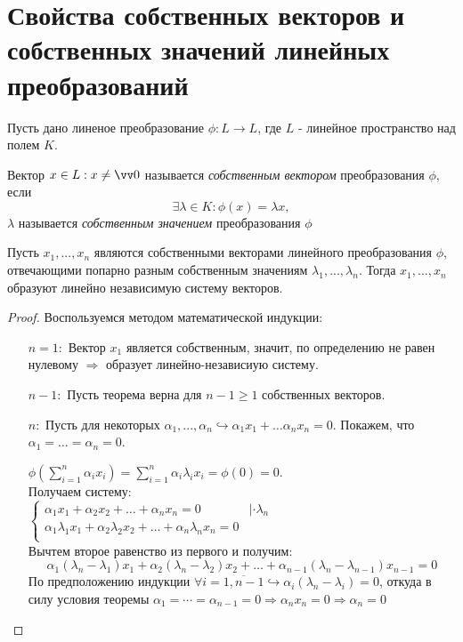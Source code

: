 \section{Свойства собственных векторов и собственных значений линейных преобразований}
Пусть дано линеное преобразование $\phi: L \rightarrow L$, где $L$ - линейное пространство над полем $K$.
\begin{defn}
Вектор $x \in L: x \neq \vv 0$ называется \textit{собственным вектором} преобразования $\phi$, если 
\begin{equation}
\exists \lambda \in K: \phi(x)=\lambda x,
\end{equation}
$\lambda$ называется \textit{собственным значением} преобразования $\phi$ 
\end{defn}
\begin{thm}
Пусть $x_1,...,x_n$ являются собственными векторами линейного преобразования $\phi$, отвечающими попарно разным собственным значениям $\lambda_1,...,\lambda_n$. Тогда $x_1,...,x_n$ образуют линейно независимую систему векторов.
\end{thm}
\begin{proof}
Воспользуемся методом математической индукции:
\linebreak\vspace*{-\baselineskip}
\begin{itemize}
\item[\underline{$n=1:$}] Вектор $x_1$ является собственным, значит, по определению не равен нулевому $\Rightarrow$ образует линейно-независиую систему.
\item[\underline{$n-1:$}] Пусть теорема верна для $n-1\ge 1$ собственных векторов.

\item[\underline{$n:$}] Пусть для некоторых $\alpha_1,...,\alpha_n \hookrightarrow \alpha_1 x_1 + \ldots \alpha_n x_n = 0$. Покажем, что $\alpha_1=\ldots=\alpha_n=0$.

$\phi(\sum_{i=1}^n \alpha_i x_i)=\sum_{i=1}^n \alpha_i \lambda_i x_i = \phi(0)=0$. \\
Получаем систему: \\
$\begin{cases}
\alpha_1 x_1 + \alpha_2 x_2 + \ldots + \alpha_n x_n = 0 & |\cdot \lambda_n \\
\alpha_1 \lambda_1 x_1 + \alpha_2 \lambda_2 x_2 + \ldots + \alpha_n \lambda_n x_n = 0 \\
\end{cases}$ \\
Вычтем второе равенство из первого и получим:
\begin{equation*}
\alpha_1 (\lambda_n-\lambda_1) x_1 + \alpha_2 (\lambda_n-\lambda_2) x_2 + \ldots + \alpha_{n-1} (\lambda_n-\lambda_{n-1}) x_{n-1} = 0
\end{equation*}
По предположению индукции $\forall i=\overline{1,n-1} \hookrightarrow \alpha_i(\lambda_n-\lambda_i)=0$, откуда в силу условия теоремы $\alpha_1=\cdots=\alpha_{n-1}=0 \Rightarrow \alpha_n x_n=0 \Rightarrow \alpha_n=0$
\end{itemize}
\vspace{-1.65\baselineskip}
\end{proof}
